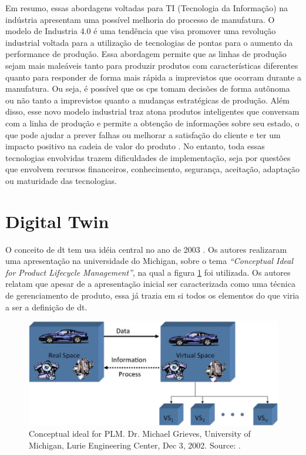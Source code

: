 Em resumo, essas abordagens voltadas para TI (Tecnologia da Informação) na indústria apresentam uma possível melhoria do processo de manufatura. O modelo de Industria 4.0 é uma tendência que visa promover uma revolução industrial voltada para a utilização de tecnologias de pontas para o aumento da performance de produção. Essa abordagem permite que as linhas de produção sejam mais maleáveis tanto para produzir produtos com características diferentes quanto para responder de forma mais rápida a imprevistos que ocorram durante a manufatura. Ou seja, é possível que os \acrshort{cps} tomam decisões de forma autônoma ou não tanto a imprevistos quanto a mudanças estratégicas de produção. Além disso, esse novo modelo industrial traz atona produtos inteligentes que conversam com a linha de produção e permite a obtenção de informações sobre seu estado, o que pode ajudar a prever falhas ou melhorar a satisfação do cliente e ter um impacto  positivo na cadeia de valor do produto \cite{economies6030046}.  No entanto, toda essas tecnologias envolvidas trazem dificuldades de implementação, seja por questões que envolvem recursos financeiros, conhecimento, segurança, aceitação, adaptação ou maturidade das tecnologias.  




\section{Digital Twin}
\label{sec:digitalTwin}


O conceito de \acrfull{dt} tem usa idéia central no ano de 2003 \cite{Mihai2022, Barricelli2019}. Os autores \textcite{Grieves2017} realizaram uma apresentação  na universidade do Michigan, sobre o tema \textit{“Conceptual Ideal for Product Lifecycle Management”}, na qual a figura \ref{fig:digitalTwin} foi utilizada.  Os autores relatam que apesar de a apresentação inicial ser caracterizada como uma técnica de gerenciamento de produto, essa já trazia em si todos os elementos do que viria a ser a definição de \acrlong{dt}.

\begin{figure}[h!]
    \centering
    \includegraphics[scale=0.5]{images/Related/digitalTwing.png}
    \caption{Conceptual ideal for PLM. Dr. Michael Grieves, University of Michigan, Lurie Engineering Center, Dec 3, 2002. Source: \cite{Grieves2017}.}

    \label{fig:digitalTwin}
\end{figure}

